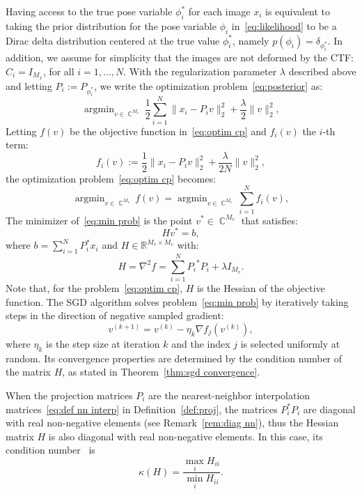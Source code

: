 \documentclass{article}
\DeclareMathOperator{\Cb}{\mathbb{C}}
\DeclareMathOperator*{\argmin}{argmin}
\begin{document}
Having access to the true pose variable $\phi_i^*$ for each image $x_i$ is 
equivalent to taking the prior distribution for the pose variable $\phi_i$ 
in~\eqref{eq:likelihood} to be a Dirac delta distribution centered at the true 
value $\phi_i^*$, namely $p(\phi_i) = \delta_{\phi_i^*}$. 
In addition, we assume for simplicity that the images are not deformed by the CTF: 
$C_i = I_{M_x}$, for all $i=1,\ldots,N$. 
With the regularization parameter $\lambda$ described above and letting  $P_i := P_{\phi_i^*}$, 
we write the optimization problem~\eqref{eq:posterior} as:
\begin{equation}
    \argmin_{v\in\Cb^{M_v}} \frac{1}{2} \sum_{i=1}^N
    \|x_i - P_i v\|_2^2 + \frac{\lambda}{2} \|v\|_2^2,
    \label{eq:optim cp}
\end{equation}
Letting $f(v)$ be the objective function in~\eqref{eq:optim cp} and $f_i(v)$
the $i$-th term: 
\begin{equation*}
    f_i(v) := \frac12 \|x_i - P_i v\|_2^2 + \frac{\lambda}{2N} \|v\|_2^2,
\end{equation*}
the optimization problem~\eqref{eq:optim cp} becomes:
\begin{equation}
    \argmin_{v\in\Cb^{M_v}} f(v) = 
    \argmin_{v\in\Cb^{M_v}} \sum_{i=1}^N f_i(v),
    \label{eq:min prob}
\end{equation}
The minimizer of~\eqref{eq:min prob} is the point $v^* \in \Cb^{M_v}$ that satisfies: 
\begin{equation}
    Hv^* = b,
    \label{eq:lin sys}
\end{equation}
where $b =  \sum_{i=1}^N P_i^* x_i$ and $H \in \mathbb{R}^{M_v \times M_v}$ with:
\begin{equation}
    H = \nabla^2 f =  \sum_{i=1}^N {P_i}^*P_i + \lambda I_{M_v}.
    \label{eq:hessian}
\end{equation}
Note that, for the problem~\eqref{eq:optim cp}, $H$ is the Hessian of the objective
function. The SGD algorithm solves problem~\eqref{eq:min prob} by iteratively 
taking steps in the direction of negative sampled gradient:
\begin{equation*}
    v^{(k+1)} = v^{(k)} - \eta_k \nabla f_j(v^{(k)}),
\end{equation*}
where $\eta_k$ is the step size at iteration $k$ and the index $j$ is selected
uniformly at random. Its convergence properties are determined by the condition 
number of the matrix $H$, as stated in Theorem~\ref{thm:sgd convergence}.

When the projection matrices $P_i$ are the nearest-neighbor interpolation 
matrices~\eqref{eq:def nn interp} in Definition~\ref{def:proj}, 
the matrices $P_i^* P_i$ are diagonal with real non-negative elements (see 
Remark~\ref{rem:diag nn}), thus the Hessian matrix $H$ is also diagonal with real 
non-negative elements. In this case, its condition number~\cite{trefethen_numerical_1997} is
\begin{equation}
    \kappa(H) = \frac{\max_i H_{ii}}{\min_i H_{ii}}.
    \label{eq:cond H}    
\end{equation}
\end{document}
